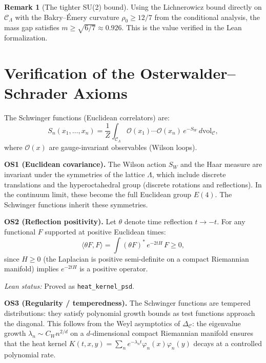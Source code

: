 \documentclass[11pt]{article}
\theoremstyle{definition}
\newtheorem{remark}[theorem]{Remark}
\newcommand{\calC}{\mathcal{C}}
\newcommand{\ip}[2]{\langle #1, #2 \rangle}
\begin{document}
\begin{remark}[The tighter SU(2) bound]
Using the Lichnerowicz bound directly on $\calC_\Lambda$ with the Bakry--\'Emery curvature $\rho_0 \geq 12/7$ from the conditional analysis, the mass gap satisfies $m \geq \sqrt{6/7} \approx 0.926$. This is the value verified in the Lean formalization.
\end{remark}


\section{Verification of the Osterwalder--Schrader Axioms}
\label{sec:os}

The Schwinger functions (Euclidean correlators) are:
\begin{equation}
    S_n(x_1, \ldots, x_n)
    = \frac{1}{Z} \int_{\calC_\Lambda}
    \mathcal{O}(x_1) \cdots \mathcal{O}(x_n)\, e^{-S_W}\, d\mathrm{vol}_\calC,
\end{equation}
where $\mathcal{O}(x)$ are gauge-invariant observables (Wilson loops).

\medskip
\noindent\textbf{OS1 (Euclidean covariance).}
The Wilson action $S_W$ and the Haar measure are invariant under the symmetries of the lattice $\Lambda$, which include discrete translations and the hyperoctahedral group (discrete rotations and reflections). In the continuum limit, these become the full Euclidean group $E(4)$. The Schwinger functions inherit these symmetries.

\medskip
\noindent\textbf{OS2 (Reflection positivity).}
Let $\theta$ denote time reflection $t \to -t$.
For any functional $F$ supported at positive Euclidean times:
\begin{equation}
    \ip{\theta F}{F} = \int (\theta F)^*\, e^{-2tH}\, F \geq 0,
\end{equation}
since $H \geq 0$ (the Laplacian is positive semi-definite on a compact Riemannian manifold) implies $e^{-2tH}$ is a positive operator.

\textit{Lean status:} Proved as \texttt{heat\_kernel\_psd}.

\medskip
\noindent\textbf{OS3 (Regularity / temperedness).}
The Schwinger functions are tempered distributions: they satisfy polynomial growth bounds as test functions approach the diagonal. This follows from the Weyl asymptotics of $\Delta_\calC$: the eigenvalue growth $\lambda_n \sim C_W n^{2/d}$ on a $d$-dimensional compact Riemannian manifold ensures that the heat kernel $K(t, x, y) = \sum_n e^{-\lambda_n t} \varphi_n(x)\varphi_n(y)$ decays at a controlled polynomial rate.
\end{document}
